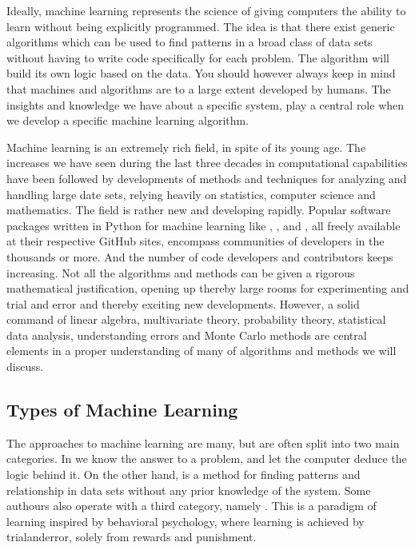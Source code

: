 \documentclass[letterpaper,10pt,english]{sphinxmanual}
\begin{document}
Ideally, machine learning represents the science of giving computers
the ability to learn without being explicitly programmed.  The idea is
that there exist generic algorithms which can be used to find patterns
in a broad class of data sets without having to write code
specifically for each problem. The algorithm will build its own logic
based on the data.  You should however always keep in mind that
machines and algorithms are to a large extent developed by humans. The
insights and knowledge we have about a specific system, play a central
role when we develop a specific machine learning algorithm.

Machine learning is an extremely rich field, in spite of its young
age. The increases we have seen during the last three decades in
computational capabilities have been followed by developments of
methods and techniques for analyzing and handling large date sets,
relying heavily on statistics, computer science and mathematics.  The
field is rather new and developing rapidly. Popular software packages
written in Python for machine learning like
,
,
 and , all
freely available at their respective GitHub sites, encompass
communities of developers in the thousands or more. And the number of
code developers and contributors keeps increasing. Not all the
algorithms and methods can be given a rigorous mathematical
justification, opening up thereby large rooms for experimenting and
trial and error and thereby exciting new developments.  However, a
solid command of linear algebra, multivariate theory, probability
theory, statistical data analysis, understanding errors and Monte
Carlo methods are central elements in a proper understanding of many
of algorithms and methods we will discuss.


\subsection{Types of Machine Learning}
\label{\detokenize{chapter2:types-of-machine-learning}}
The approaches to machine learning are many, but are often split into
two main categories.  In  we know the answer to a
problem, and let the computer deduce the logic behind it. On the other
hand,  is a method for finding patterns and
relationship in data sets without any prior knowledge of the system.
Some authours also operate with a third category, namely
. This is a paradigm of learning inspired by
behavioral psychology, where learning is achieved by trial\sphinxhyphen{}and\sphinxhyphen{}error,
solely from rewards and punishment.
\end{document}
